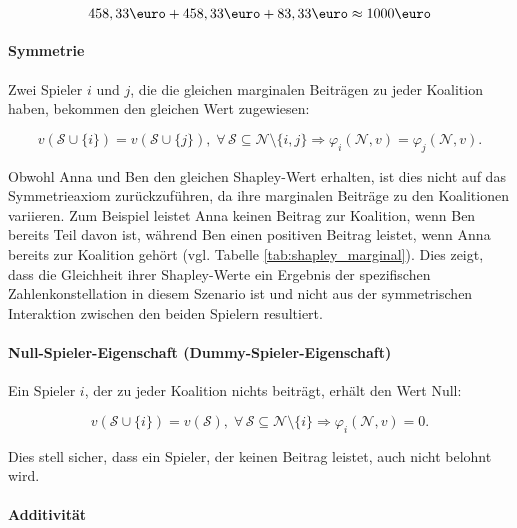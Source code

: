 \begin{equation}
  458,33 \text{\euro} + 458,33 \text{\euro} + 83,33 \text{\euro} \approx 1000 \text{\euro} 
\end{equation}


\paragraph{Symmetrie}

Zwei Spieler $i$ und $j$, die die gleichen marginalen Beiträgen zu jeder Koalition haben, bekommen den gleichen Wert
zugewiesen:

\begin{equation}
v(\mathcal{S} \cup \{i\}) = v(\mathcal{S} \cup \{j\}), \; \forall\, \mathcal{S} \subseteq \mathcal{N} \setminus \{i, j\} \Rightarrow \varphi_i (\mathcal{N}, v) = \varphi_j (\mathcal{N}, v).
\end{equation}

Obwohl Anna und Ben den gleichen Shapley-Wert erhalten, ist dies nicht auf das Symmetrieaxiom zurückzuführen, 
da ihre marginalen Beiträge zu den Koalitionen variieren. Zum Beispiel leistet Anna keinen Beitrag zur Koalition, 
wenn Ben bereits Teil davon ist, während Ben einen positiven Beitrag leistet, 
wenn Anna bereits zur Koalition gehört (vgl. Tabelle \ref{tab:shapley_marginal}). Dies zeigt, dass die Gleichheit ihrer Shapley-Werte ein Ergebnis der 
spezifischen Zahlenkonstellation in diesem Szenario ist und nicht aus der symmetrischen Interaktion 
zwischen den beiden Spielern resultiert.

\paragraph{Null-Spieler-Eigenschaft (Dummy-Spieler-Eigenschaft)}

Ein Spieler $i$, der zu jeder Koalition nichts beiträgt, erhält den Wert Null:

\begin{equation}
  v(\mathcal{S} \cup \{i\}) =  v(\mathcal{S}), \; \forall\, \mathcal{S} \subseteq \mathcal{N} \setminus \{i\} \Rightarrow \varphi_i (\mathcal{N}, v) = 0.
\end{equation}

Dies stell sicher, dass ein Spieler, der keinen Beitrag leistet, auch nicht belohnt wird. 

\paragraph{Additivität} 

